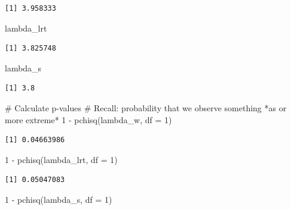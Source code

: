\documentclass[
  letterpaper,
  DIV=11,
  numbers=noendperiod]{scrreprt}
\newenvironment{Shaded}{\begin{snugshade}}{\end{snugshade}}
\newcommand{\AttributeTok}[1]{\textcolor[rgb]{0.40,0.45,0.13}{#1}}
\newcommand{\CommentTok}[1]{\textcolor[rgb]{0.37,0.37,0.37}{#1}}
\newcommand{\DecValTok}[1]{\textcolor[rgb]{0.68,0.00,0.00}{#1}}
\newcommand{\FunctionTok}[1]{\textcolor[rgb]{0.28,0.35,0.67}{#1}}
\newcommand{\NormalTok}[1]{\textcolor[rgb]{0.00,0.23,0.31}{#1}}
\newcommand{\SpecialCharTok}[1]{\textcolor[rgb]{0.37,0.37,0.37}{#1}}
\begin{document}
\begin{verbatim}
[1] 3.958333
\end{verbatim}

\begin{Shaded}
\begin{Highlighting}[]
\NormalTok{lambda\_lrt}
\end{Highlighting}
\end{Shaded}

\begin{verbatim}
[1] 3.825748
\end{verbatim}

\begin{Shaded}
\begin{Highlighting}[]
\NormalTok{lambda\_s}
\end{Highlighting}
\end{Shaded}

\begin{verbatim}
[1] 3.8
\end{verbatim}

\begin{Shaded}
\begin{Highlighting}[]
\CommentTok{\# Calculate p{-}values}
\CommentTok{\# Recall: probability that we observe something *as or more extreme*}
\DecValTok{1} \SpecialCharTok{{-}} \FunctionTok{pchisq}\NormalTok{(lambda\_w, }\AttributeTok{df =} \DecValTok{1}\NormalTok{)}
\end{Highlighting}
\end{Shaded}

\begin{verbatim}
[1] 0.04663986
\end{verbatim}

\begin{Shaded}
\begin{Highlighting}[]
\DecValTok{1} \SpecialCharTok{{-}} \FunctionTok{pchisq}\NormalTok{(lambda\_lrt, }\AttributeTok{df =} \DecValTok{1}\NormalTok{)}
\end{Highlighting}
\end{Shaded}

\begin{verbatim}
[1] 0.05047083
\end{verbatim}

\begin{Shaded}
\begin{Highlighting}[]
\DecValTok{1} \SpecialCharTok{{-}} \FunctionTok{pchisq}\NormalTok{(lambda\_s, }\AttributeTok{df =} \DecValTok{1}\NormalTok{)}
\end{Highlighting}
\end{Shaded}
\end{document}
